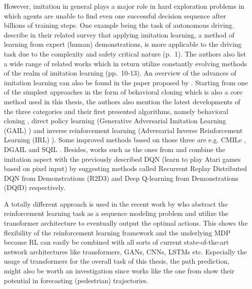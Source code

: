 However, imitation in general plays a major role in hard exploration problems in which agents are unable to find even one successful decision sequence after billions of training steps. One example being the task of autonomous driving. \cite{le2022survey} describe in their related survey that applying imitation learning, a method of learning from expert (human) demonstrations, is more applicable to the driving task due to the complexity and safety critical nature (p.~1). The authors also list a wide range of related works which in return utilize  constantly evolving methods of the realm of imitation learning (pp.~10-13). An overview of the advances of imitation learning can also be found in the paper proposed by \cite{zheng2021imitation}. Starting from one of the simplest approaches in the form of behavioral cloning which is also a core method used in this thesis, the authors also mention the latest developments of the three categories and their first presented algorithms, namely behavioral cloning \cite[]{alvinn}, direct policy learning (Generative Adversarial Imitation Learning (GAIL) \cite[]{ho2016generative}) and inverse reinforcement learning (Adversarial Inverse Reinforcement Learning (IRL) \cite[]{fu2017learning}). Some improved methods based on those three are e.g. CMILe \cite[]{tu2021closing}, DGAIL \cite[]{zuo2020deterministic} and SQIL \cite[]{reddy2019sqil}. Besides, works such as the ones from \cite{paine2019making} and \cite{hester2017deep} combine the imitation aspect with the previously described DQN (learn to play Atari games based on pixel input) by suggesting methods called  Recurrent Replay Distributed DQN from Demonstrations (R2D3) and Deep Q-learning from Demonstrations (DQfD) respectively.
\par
A totally different approach is used in the recent work by \cite{chen2021decision} who abstract the reinforcement learning task as a sequence modeling problem and utilize the transformer architecture to eventually output the optimal actions. This shows the flexibility of the reinforcement learning framework and the underlying MDP because RL can easily be combined with all sorts of current state-of-the-art network architectures like transformers, GANs, CNNs, LSTMs etc. Especially the usage of transformers for the overall task of this thesis, the path prediction, might also be worth an investigation since works like the one from \cite{giuliari2021transformer} show their potential in forecasting (pedestrian) trajectories.
\par
